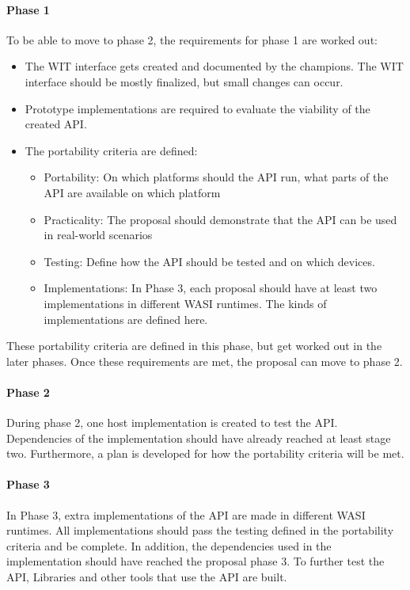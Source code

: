 \paragraph{Phase 1}
To be able to move to phase 2, the requirements for phase 1 are worked out:
\begin{itemize}
\item The WIT interface gets created and documented by the champions. The WIT interface should be mostly finalized, but small changes can occur.
\item Prototype implementations are required to evaluate the viability of the created API.
\item The portability criteria are defined:
\begin{itemize}
\item Portability: On which platforms should the API run, what parts of the API are available on which platform
\item Practicality: The proposal should demonstrate that the API can be used in real-world scenarios
\item Testing: Define how the API should be tested and on which devices.
\item Implementations: In Phase 3, each proposal should have at least two implementations in different WASI runtimes. The kinds of implementations are defined here.
\end{itemize}
\end{itemize}

These portability criteria are defined in this phase, but get worked out in the later phases.
Once these requirements are met, the proposal can move to phase 2.

\paragraph{Phase 2}
During phase 2, one host implementation is created to test the API. Dependencies of the implementation should have already reached at least stage two.
Furthermore, a plan is developed for how the portability criteria will be met.

\paragraph{Phase 3}
In Phase 3, extra implementations of the API are made in different WASI runtimes. All implementations should pass the testing defined in the portability criteria and be complete. In addition, the dependencies used in the implementation should have reached the proposal phase 3. To further test the API, Libraries and other tools that use the API are built.

